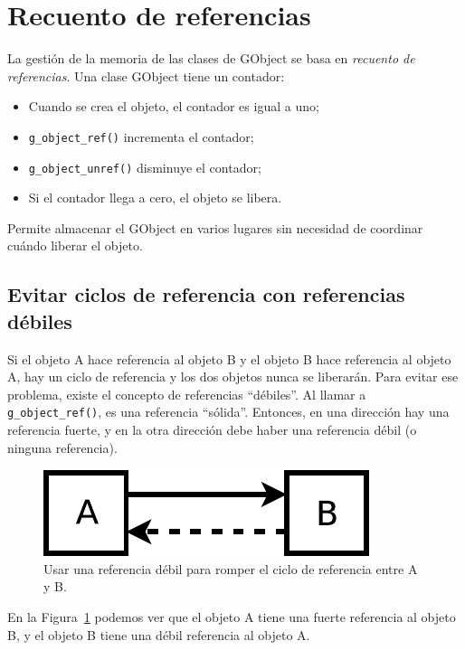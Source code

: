 \section{Recuento de referencias}

La gestión de la memoria de las clases de GObject se basa en \emph{recuento de referencias}. Una clase GObject tiene un contador:
\begin{itemize}
    \item Cuando se crea el objeto, el contador es igual a uno;
    \item \lstinline{g_object_ref()} incrementa el contador;
    \item \lstinline{g_object_unref()} disminuye el contador;
    \item Si el contador llega a cero, el objeto se libera.
\end{itemize}

Permite almacenar el GObject en varios lugares sin necesidad de coordinar cuándo liberar el objeto.

\subsection{Evitar ciclos de referencia con referencias débiles}

Si el objeto A hace referencia al objeto B y el objeto B hace referencia al objeto A, hay un ciclo de referencia y los dos objetos nunca se liberarán. Para evitar ese problema, existe el concepto de referencias ``débiles''. Al llamar a \lstinline{g_object_ref()}, es una referencia ``sólida''. Entonces, en una dirección hay una referencia fuerte, y en la otra dirección debe haber una referencia débil (o ninguna referencia).

\begin{figure}
  \begin{center}
    \includegraphics[scale=0.75]{assets/img/weak-ref.pdf}
    \caption{Usar una referencia débil para romper el ciclo de referencia entre A y B.}
    \label{oop-gobject-weak-ref-schema}
  \end{center}
\end{figure}

En la Figura~\ref{oop-gobject-weak-ref-schema} podemos ver que el objeto A tiene una fuerte referencia al objeto B, y el objeto B tiene una débil referencia al objeto A.

